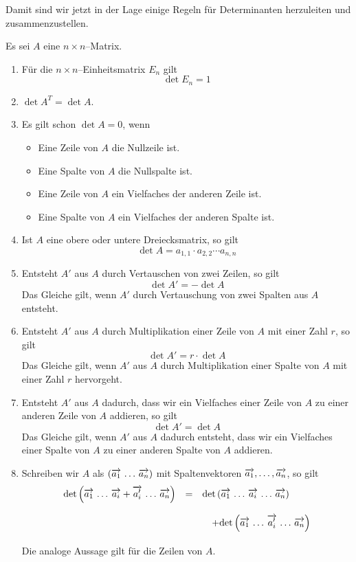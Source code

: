 \medbreak

Damit sind wir jetzt in der Lage einige Regeln für Determinanten herzuleiten und zusammenzustellen. 

\begin{regel}\label{det_n_rule} Es sei $A$ eine $n \times n$--Matrix.

\begin{enumerate}
\item Für die $n \times n$--Einheitsmatrix $E_n$ gilt
  	$$ \det{E_n} = 1 $$
\item $\det{A^T} = \det{A}$.
\item Es gilt schon $\det{A} = 0$, wenn 

\begin{itemize}
\item Eine Zeile von $A$ die Nullzeile ist.
\item Eine Spalte von $A$ die Nullspalte ist.
\item Eine Zeile von $A$ ein Vielfaches der anderen Zeile ist.
\item Eine Spalte von $A$ ein Vielfaches der anderen Spalte ist. 
\end{itemize}
\item  Ist $A$ eine obere oder untere Dreiecksmatrix, so gilt
  	$$ \det{A} = a_{1,1} \cdot a_{2,2} \cdots a_{n,n} $$
\item Entsteht $A'$ aus $A$ durch Vertauschen von zwei Zeilen, so gilt
  	$$ \det{A'} = - \det{A} $$
Das Gleiche gilt, wenn $A'$ durch Vertauschung von zwei Spalten aus $A$ entsteht.
\item Entsteht $A'$ aus $A$ durch Multiplikation einer Zeile von $A$ mit einer Zahl $r$, so gilt
  	$$ \det{A'} = r \cdot \det{A} $$
Das Gleiche gilt, wenn $A'$ aus $A$ durch Multiplikation einer Spalte von $A$ mit 
einer Zahl $r$ hervorgeht.
\item Entsteht $A'$ aus $A$ dadurch, dass wir ein 
Vielfaches einer Zeile von $A$ zu einer anderen Zeile von $A$ addieren, so gilt
  	$$ \det{A'} =  \det{A} $$
Das Gleiche gilt, wenn $A'$ aus $A$ dadurch entsteht, dass wir ein Vielfaches 
einer Spalte von $A$ zu einer anderen Spalte von $A$ addieren.
\item Schreiben wir $A$ als $\left(\overrightarrow{a_1} \, \ldots \, \overrightarrow{a_n}
\right)$ mit Spaltenvektoren $\overrightarrow{a_1}, \ldots , \overrightarrow{a_n}$, so 
gilt
  	$$ \begin{array} {l c l}
   	\det{\vektor{a_1} \, \ldots \, \vektor{a_i} + \vektor{a'_i} 
  	\, \ldots \, \vektor{a_n}} &  = &  
  	\det{\vektor{a_1} \, \ldots \, \vektor{a_i} \, \ldots \, 
   	\vektor{a_n}} \\
   	& & \quad + \det{\vektor{a_1} \, \ldots \, \vektor{a'_i} 
  	\, \ldots \, \vektor{a_n}} 
  	\end{array} $$
Die analoge Aussage gilt für die Zeilen von $A$.
\end{enumerate}
\end{regel}

